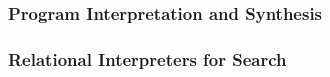 \documentclass[xcolor=table, aspectratio=169]{beamer}
\begin{document}

%     







\begin{frame}[fragile]
    \frametitle{Program Interpretation and Synthesis}

    
\end{frame}

\begin{frame}[fragile]
  \frametitle{Relational Interpreters for Search}

\begin{columns}[T]
  \begin{column}{0.49\textwidth}
    
  \end{column}

  \begin{column}{0.49\textwidth}
    
  \end{column}
\end{columns}

 
\end{frame}
\end{document}
